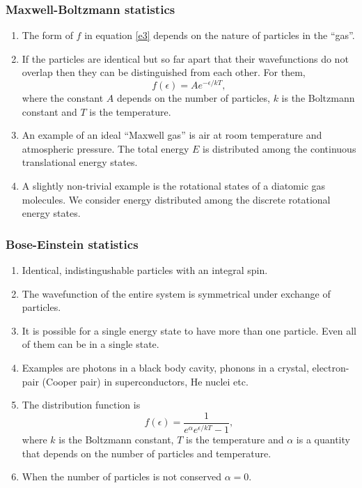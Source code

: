 \documentclass{beamer}
\begin{document}
\begin{frame}
\frametitle{Maxwell-Boltzmann statistics}
\begin{enumerate}
\item The form of $f$ in equation \eqref{e3} depends on the nature of particles
in the ``gas''.
\item If the particles are identical but so far apart that their wavefunctions 
do not overlap then they can be distinguished from each other. For them,
\begin{equation}\label{e4}
f(\epsilon) = Ae^{-\epsilon/kT},
\end{equation}
where the constant $A$ depends on the number of particles, $k$ is the Boltzmann
constant and $T$ is the temperature.
\item An example of an ideal ``Maxwell gas'' is air at room temperature and 
atmospheric pressure. The total energy $E$ is distributed among the continuous
translational energy states.
\item A slightly non-trivial example is the rotational states of a diatomic gas
molecules. We consider energy distributed among the discrete rotational energy
states. 
\end{enumerate}
\end{frame}

\begin{frame}
\frametitle{Bose-Einstein statistics}
\begin{enumerate}
\item Identical, indistingushable particles with an integral spin.
\item The wavefunction of the entire system is symmetrical under exchange of 
particles.
\item It is possible for a single energy state to have more than one particle.
Even all of them can be in a single state.
\item Examples are photons in a black body cavity, phonons in a crystal, 
electron-pair (Cooper pair) in superconductors, He nuclei etc.
\item The distribution function is
\begin{equation}\label{e5}
f(\epsilon) = \frac{1}{e^\alpha e^{\epsilon/kT} - 1},
\end{equation}
where $k$ is the Boltzmann constant, $T$ is the temperature and $\alpha$ is a 
quantity that depends on the number of particles and temperature.
\item When the number of particles is not conserved $\alpha = 0$.
\end{enumerate}
\end{frame}
\end{document}
